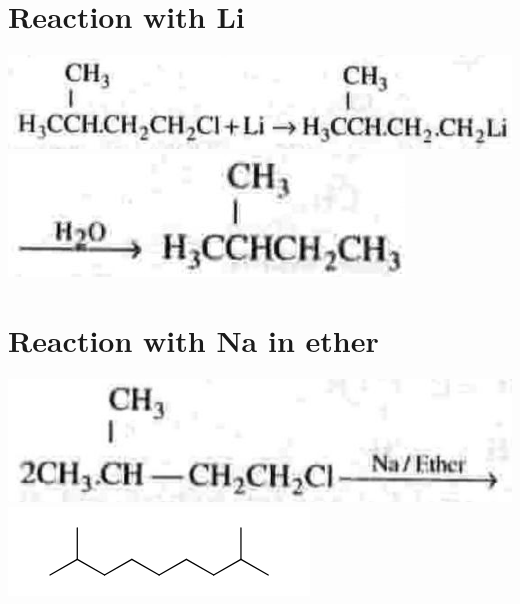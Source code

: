 \documentclass[10pt]{article}
\begin{document}
\section*{Reaction with Li}
\includegraphics[max width=\textwidth, center]{2025_01_28_8470952b98110cec3aabg-242(3)}\\
\includegraphics[max width=\textwidth, center]{2025_01_28_8470952b98110cec3aabg-242(7)}

\section*{Reaction with Na in ether}
\includegraphics[max width=\textwidth, center]{2025_01_28_8470952b98110cec3aabg-242}\\
\includegraphics{smile-17e3c19d54f73c1d3f1eebe1a94a3096626088ed}
\end{document}
